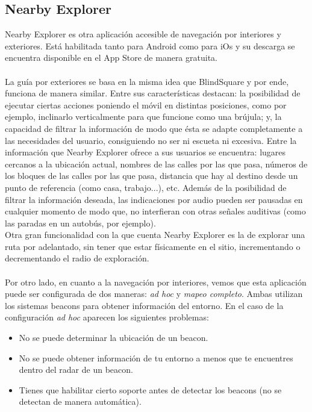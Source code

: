 \documentclass{article}
\begin{document}
	\subsection{Nearby Explorer}
	Nearby Explorer es otra aplicación accesible de navegación por interiores y exteriores. Está habilitada tanto para Android como para iOs y su descarga se encuentra disponible en el App Store de manera gratuita. 
	\\
	\\
	La guía por exteriores se basa en la misma idea que BlindSquare y por ende, funciona de manera similar. Entre sus características destacan: la posibilidad de ejecutar ciertas acciones poniendo el móvil en distintas posiciones, como por ejemplo, inclinarlo verticalmente para que funcione como una brújula; y, la capacidad de filtrar la información de modo que ésta se adapte completamente a las necesidades del usuario, consiguiendo no ser ni escueta ni excesiva. Entre la información que Nearby Explorer ofrece a sus usuarios se encuentra: lugares cercanos a la ubicación actual, nombres de las calles por las que pasa, números de los bloques de las calles por las que pasa, distancia que hay al destino desde un punto de referencia (como casa, trabajo...), etc. 
	Además de la posibilidad de filtrar la información deseada, las indicaciones por audio pueden ser pausadas en cualquier momento de modo que, no interfieran con otras señales auditivas (como las paradas en un autobús, por ejemplo). 
	\\
	Otra gran funcionalidad con la que cuenta Nearby Explorer es la de explorar una ruta por adelantado, sin tener que estar físicamente en el sitio, incrementando o decrementando el radio de exploración.
	\\
	\\
	Por otro lado, en cuanto a la navegación por interiores, vemos que esta aplicación puede ser configurada de dos maneras: \textit{ad hoc} y \textit{mapeo completo}.
	Ambas utilizan los sistemas beacons para obtener información del entorno.
	En el caso de la configuración \textit{ad hoc} aparecen los siguientes problemas:
	\begin{itemize}
		\item No se puede determinar la ubicación de un beacon. 
		\item No se puede obtener información de tu entorno a menos que te encuentres dentro del radar de un beacon.
		\item Tienes que habilitar cierto soporte antes de detectar los beacons (no se detectan de manera automática).
	\end{itemize}
\end{document}
